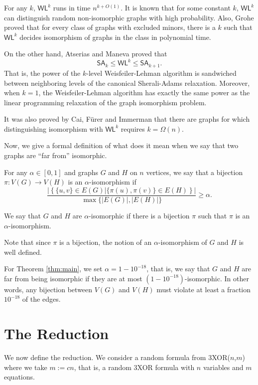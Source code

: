 \documentclass[a4paper,twoside,justified]{tufte-handout}
\begin{document}
For any $k$, $\textsf{WL}^k$ runs in time $n^{k+O(1)}$.
It is known that for some constant $k$, $\textsf{WL}^k$ can distinguish random non-isomorphic graphs
with high probability. Also, Grohe \cite{groheisomorphism} proved that 
for every class of graphs with excluded minors, there is a $k$ such that 
$\textsf{WL}^k$ decides isomorphism of graphs in the class in polynomial time.

On the other hand, Atserias and Maneva \cite{sheraliadamsisomorphism} proved that
\[
\mathsf{SA}_k \le \textsf{WL}^k \le \mathsf{SA}_{k+1}.
\]
That is, the power of the $k$-level Weisfeiler-Lehman algorithm is sandwiched between
neighboring levels of the canonical Sherali-Adams relaxation. Moreover, when $k=1$, 
the Weisfeiler-Lehman algorithm has exactly the same power as the linear programming relaxation of
the graph isomorphism problem.

It was also proved by Cai, F{\"{u}}rer and Immerman \cite{cai1992optimal} that there are graphs
for which distinguishing isomorphism with $\textsf{WL}^k$ requires $k=\Omega(n)$.

Now, we give a formal definition of what does it mean when we say that
two graphs are ``far from'' isomorphic.
\begin{definition}\label{def:alpha-iso}
  For any $\alpha \in [0, 1]$ and graphs $G$ and $H$ on $n$ vertices,
  we say that a bijection $\pi \colon V(G) \to V(H)$ is an
  $\alpha$-isomorphism if
  \[
  \frac{|\left\{ \{u,v\} \in E(G) | \{\pi(u),\pi(v)\} \in E(H) \right\}|}{\max \{|E(G)|,|E(H)|\}} \ge \alpha.
  \]

  We say that $G$ and $H$ are $\alpha$-isomorphic if there is a bijection $\pi$ such that
  $\pi$ is an $\alpha$-isomorphism.
\end{definition}
\begin{remark}
  Note that since $\pi$ is a bijection, the notion of an $\alpha$-isomorphism of $G$ and $H$ 
  is well defined.
\end{remark}
For Theorem \ref{thm:main}, we set $\alpha=1-10^{-18}$, that is, we say that $G$ and $H$ are far from being
isomorphic if they are at most $(1-10^{-18})$-isomorphic. In other words, any bijection between $V(G)$ and $V(H)$
must violate at least a fraction $10^{-18}$ of the edges.

\section{The Reduction}
We now define the reduction. We consider a random formula from 3XOR($n$,$m$) where we take $m:=cn$,
that is, a random 3XOR formula with $n$ variables and $m$ equations.
\end{document}
